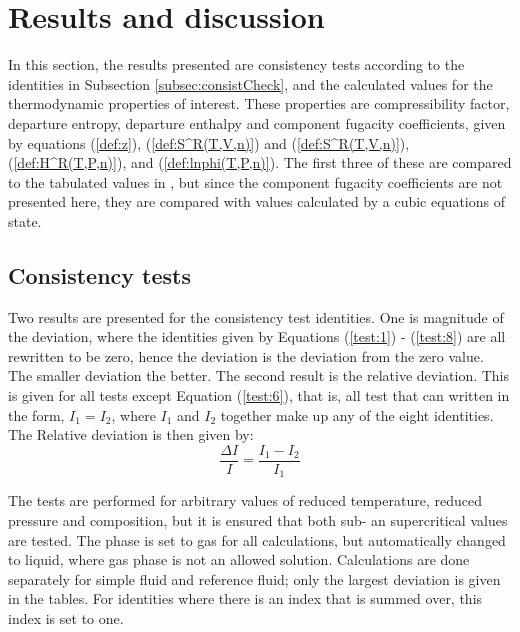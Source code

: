 \documentclass[internal,english]{sintefmemo2012}
\numberwithin{equation}{section}
\newcommand*{\reff}[1]{(\ref{#1})}
\begin{document}
\section{Results and discussion}
In this section, the results presented are consistency tests according to the identities in Subsection \ref{subsec:consistCheck}, and the calculated values for the thermodynamic properties of interest. These properties are compressibility factor, departure entropy, departure enthalpy and component fugacity coefficients, given by equations \reff{def:z}, \reff{def:S^R(T,V,n)} and \reff{def:S^R(T,V,n)}, \reff{def:H^R(T,P,n)}, and \reff{def:lnphi(T,P,n)}. The first three of these are compared to the tabulated values in \cite{LK}, but since the component fugacity coefficients are not presented here, they are compared with values calculated by a cubic equations of state.

\subsection{Consistency tests}
Two results are presented for the consistency test identities. One is magnitude of the deviation, where the identities given by Equations \reff{test:1} - \reff{test:8} are all rewritten to be zero, hence the deviation is the deviation from the zero value. The smaller deviation the better. The second result is the relative deviation. This is given for all tests except Equation \reff{test:6}, that is, all test that can written in the form, $I_1 = I_2$, where $I_1$ and $I_2$ together make up any of the eight identities. The Relative deviation is then given by:
\begin{equation}
\frac{\Delta I}{I} = \frac{I_1 - I_2}{I_1}
\end{equation}

The tests are performed for arbitrary values of reduced temperature, reduced pressure and composition, but it is ensured that both sub- an supercritical values are tested. The phase is set to gas for all calculations, but automatically changed to liquid, where gas phase is not an allowed solution. Calculations are done separately for simple fluid and reference fluid; only the largest deviation is given in the tables. For identities where there is an index that is summed over, this index is set to one.
\end{document}
